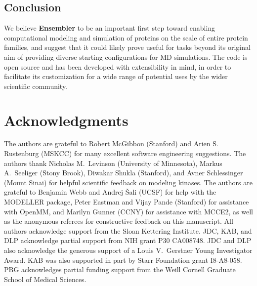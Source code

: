 \documentclass[aps,pre,twocolumn,nofootinbib,superscriptaddress,linenumbers]{revtex4-1}
\begin{document}
\color{black}

\subsection*{Conclusion}

We believe {\bf Ensembler} to be an important first step toward enabling computational modeling and simulation of proteins on the scale of entire protein families, and suggest that it could likely prove useful for tasks beyond its original aim of providing diverse starting configurations for MD simulations.
The code is open source and has been developed with extensibility in mind, in order to facilitate its customization for a wide range of potential uses by the wider scientific community.


\section{Acknowledgments}
\label{section:acknowledgments}

The authors are grateful to Robert McGibbon (Stanford) and Arien S. Rustenburg (MSKCC) for many excellent software engineering suggestions.
The authors thank Nicholas M.~Levinson (University of Minnesota), Markus A.~Seeliger (Stony Brook), Diwakar Shukla (Stanford), and Avner Schlessinger (Mount Sinai) for helpful scientific feedback on modeling kinases.
The authors are grateful to Benjamin Webb and Andrej \v{S}ali (UCSF) for help with the MODELLER package, Peter Eastman and Vijay Pande (Stanford) for assistance with OpenMM, and Marilyn Gunner (CCNY) for assistance with MCCE2, {\color{red} as well as the anonymous referees for constructive feedback on this manuscript.}
All authors acknowledge support from the Sloan Kettering Institute.
JDC, KAB, and DLP acknowledge partial support from NIH grant P30 CA008748.
JDC and DLP also acknowledge the generous support of a Louis V.~Gerstner Young Investigator Award.
KAB was also supported in part by Starr Foundation grant I8-A8-058.
PBG acknowledges partial funding support from the Weill Cornell Graduate School of Medical Sciences.

\end{document}
